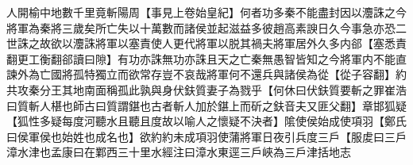 人開榆中地數千里竟斬陽周【事見上卷始皇紀】何者功多秦不能盡封因以灋誅之今將軍為秦將三歲矣所亡失以十萬數而諸侯並起滋益多彼趙高素諛日久今事急亦恐二世誅之故欲以灋誅將軍以塞責使人更代將軍以脱其禍夫將軍居外久多内郤【塞悉責翻更工衡翻郤讀曰隙】有功亦誅無功亦誅且天之亡秦無愚智皆知之今將軍内不能直諫外為亡國將孤特獨立而欲常存豈不哀哉將軍何不還兵與諸侯為從【從子容翻】約共攻秦分王其地南面稱孤此孰與身伏鈇質妻子為戮乎【何休曰伏鈇質要斬之罪崔浩曰質斬人椹也師古曰質謂鍖也古者斬人加於鍖上而斫之鈇音夫又匪父翻】章邯狐疑【狐性多疑每度河聽水且聽且度故以喻人之懷疑不決者】隂使侯始成使項羽【鄭氏曰侯軍侯也始姓也成名也】欲約約未成項羽使蒲將軍日夜引兵度三戶【服䖍曰三戶漳水津也孟康曰在鄴西三十里水經注曰漳水東逕三戶峽為三戶津括地志